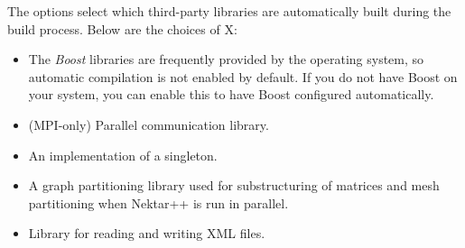 The  options select which third-party libraries are
automatically built during the \nekpp build process. Below are the choices of X:
\begin{itemize}
    \item {}

    The \emph{Boost} libraries are frequently provided by the operating system,
    so automatic compilation is not enabled by default. If you do not have
    Boost on your system, you can enable this to have Boost configured
    automatically.

    \item {}
    
    (MPI-only) Parallel communication library.
    
    \item {}
    
    An implementation of a singleton.
    
    \item {}
    
    A graph partitioning library used for substructuring of matrices and mesh
    partitioning when Nektar++ is run in parallel.
    
    \item {}
    
    Library for reading and writing XML files.
\end{itemize}

